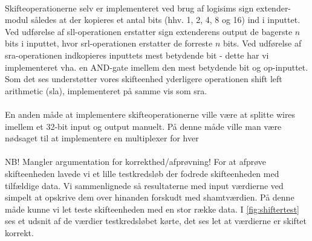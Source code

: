 \documentclass[10pt,a4paper,danish]{article}
\begin{document}
\paragraph{}
Skifteoperationerne selv er implementeret ved brug af logisims sign extender-modul således at 
der kopieres et antal bits (hhv. 1, 2, 4, 8 og 16) ind i inputtet. Ved udførelse
af sll-operationen erstatter sign extenderens output de bagerste $n$ bits i inputtet, hvor 
srl-operationen erstatter de forreste $n$ bits. Ved udførelse af sra-operationen indkopieres
inputtets mest betydende bit - dette har vi implementeret vha. en AND-gate imellem den mest
betydende bit og op-inputtet. Som det ses understøtter vores skifteenhed yderligere 
operationen shift left arithmetic (sla), implementeret på samme vis som sra.

\paragraph{}
En anden måde at implementere skifteoperationerne ville være at splitte wires imellem
et 32-bit input og output manuelt. På denne måde ville man være nødsaget til at implementere
en multiplexer for hver 

\paragraph{}
NB! Mangler argumentation for korrekthed/afprøvning!
For at afprøve skifteenheden lavede vi et lille testkredsløb der fodrede skifteenheden med tilfældige data.
Vi sammenlignede så resultaterne med input værdierne ved simpelt at opskrive dem over hinanden forskudt med shamtværdien.
På denne måde kunne vi let teste skifteenheden med en stor række data.
I \ref{fig:shiftertest} ses et udsnit af de værdier testkredsløbet kørte, det ses let at værdierne er skiftet korrekt.
\end{document}
